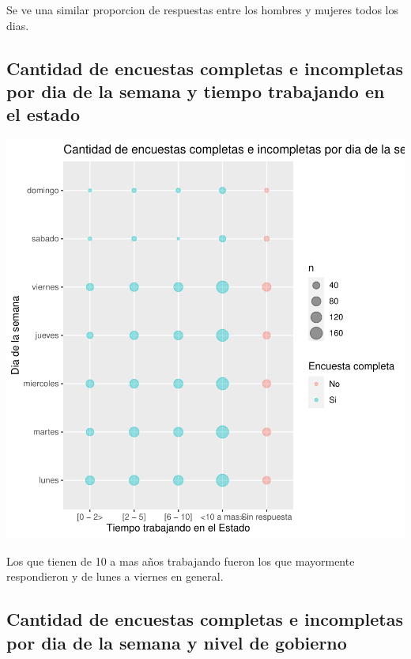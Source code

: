 \documentclass{article}
\begin{document}
Se ve una similar proporcion de respuestas entre los hombres y mujeres todos los dias.

\subsection{Cantidad de encuestas completas e incompletas por dia de la semana y tiempo trabajando en el estado}

\includegraphics{seguimientov3-023}

Los que tienen de 10 a mas años trabajando fueron los que mayormente respondieron y de lunes a viernes en general.

\subsection{Cantidad de encuestas completas e incompletas por dia de la semana y nivel de gobierno}
\end{document}
